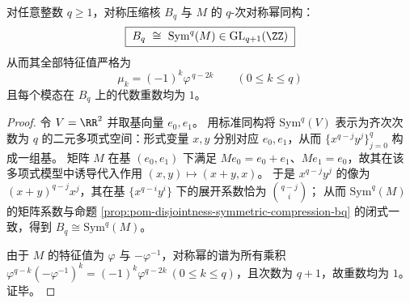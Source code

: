 \begin{proposition}[\texorpdfstring{$B_q=\mathrm{Sym}^q(M)$}{Bq=Sym^q(M)} 与谱闭式]\label{prop:pom-bq-is-symq-and-spectrum}
对任意整数 \(q\ge 1\)，对称压缩核 \(B_q\) 与 \(M\) 的 \(q\)-次对称幂同构：
\[
\boxed{\;B_q\ \cong\ \mathrm{Sym}^q(M)\in \mathrm{GL}_{q+1}(\ZZ)\;}
\]
从而其全部特征值严格为
\[
\boxed{\;\mu_k=(-1)^k\varphi^{\,q-2k}\qquad(0\le k\le q)\;}
\]
且每个模态在 \(B_q\) 上的代数重数均为 \(1\)。
\end{proposition}
\begin{proof}
令 \(V=\RR^2\) 并取基向量 \(e_0,e_1\)。
用标准同构将 \(\mathrm{Sym}^q(V)\) 表示为齐次次数为 \(q\) 的二元多项式空间：形式变量 \(x,y\) 分别对应 \(e_0,e_1\)，从而 \(\{x^{q-j}y^j\}_{j=0}^{q}\) 构成一组基。
矩阵 \(M\) 在基 \((e_0,e_1)\) 下满足 \(Me_0=e_0+e_1\)、\(Me_1=e_0\)，故其在该多项式模型中诱导代入作用
\((x,y)\mapsto (x+y,x)\)。
于是 \(x^{q-j}y^j\) 的像为 \((x+y)^{q-j}x^{j}\)，其在基 \(\{x^{q-i}y^i\}\) 下的展开系数恰为 \(\binom{q-j}{i}\)；
从而 \(\mathrm{Sym}^q(M)\) 的矩阵系数与命题 \ref{prop:pom-disjointness-symmetric-compression-bq} 的闭式一致，得到 \(B_q\cong\mathrm{Sym}^q(M)\)。
\par
由于 \(M\) 的特征值为 \(\varphi\) 与 \(-\varphi^{-1}\)，对称幂的谱为所有乘积 \(\varphi^{q-k}(-\varphi^{-1})^{k}=(-1)^k\varphi^{q-2k}\ (0\le k\le q)\)，且次数为 \(q+1\)，故重数均为 \(1\)。证毕。
\end{proof}

